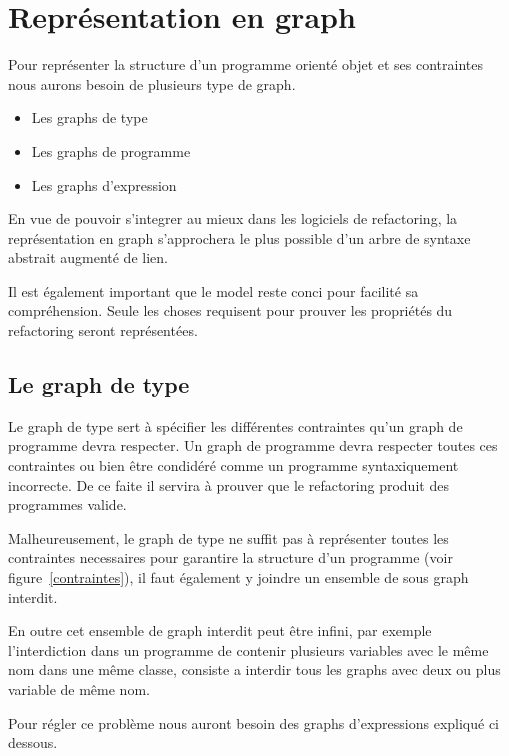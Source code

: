 \documentclass[a4paper, 12pt]{article}
\begin{document}
  \section{Représentation en graph}
  Pour représenter la structure d'un programme orienté objet et ses contraintes nous aurons besoin de plusieurs type de graph.

  \begin{itemize}[label=\textbullet]
    \item Les graphs de type
    \item Les graphs de programme
    \item Les graphs d'expression
  \end{itemize}

  En vue de pouvoir s'integrer au mieux dans les logiciels de refactoring, la représentation en graph s'approchera le plus possible d'un arbre de syntaxe abstrait augmenté de lien.

  Il est également important que le model reste conci pour facilité sa compréhension. Seule les choses requisent pour prouver les propriétés du refactoring seront représentées.

  \subsection{Le graph de type}

  Le graph de type sert à spécifier les différentes contraintes qu'un graph de programme devra respecter. Un graph de programme devra respecter toutes ces contraintes ou bien être condidéré comme un programme syntaxiquement incorrecte. De ce faite il servira à prouver que le refactoring produit des programmes valide.

  Malheureusement, le graph de type ne suffit pas à représenter toutes les contraintes necessaires pour garantire la structure d'un programme (voir figure~\ref{contraintes}), il faut également y joindre un ensemble de sous graph interdit.

  En outre cet ensemble de graph interdit peut être infini, par exemple l'interdiction dans un programme de contenir plusieurs variables avec le même nom dans une même classe, consiste a interdir tous les graphs avec deux ou plus variable de même nom.

  Pour régler ce problème nous auront besoin des graphs d'expressions expliqué ci dessous.\label{subsec:graphExpression}
\end{document}
